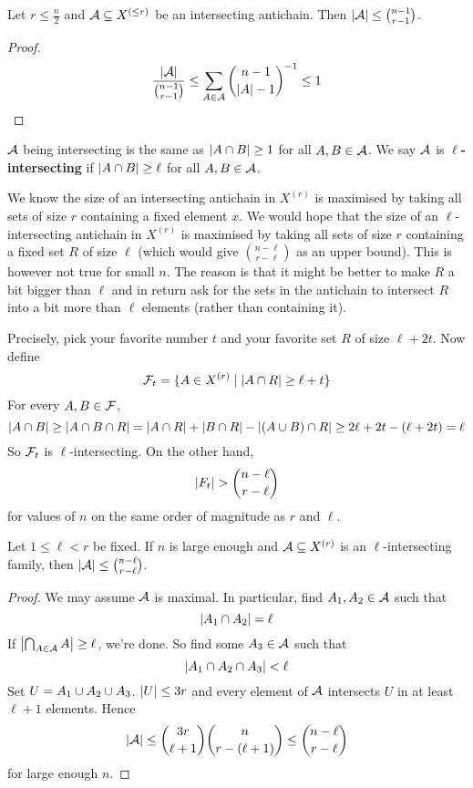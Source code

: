 \documentclass{article}
\begin{document}
\begin{nthm}
  Let $r \le \frac n2$ and $\mathcal A \subseteq X^{(\le r)}$ be an intersecting antichain. Then $\left\lvert \mathcal A\right\rvert \le \binom{n - 1}{r - 1}$.
\end{nthm}
\begin{proof}
  $$\frac{\left\lvert \mathcal A\right\rvert}{\binom{n - 1}{r - 1}} \le \sum_{A \in \mathcal A} \binom{n - 1}{\left\lvert A\right\rvert - 1}^{-1} \le 1$$
\end{proof}

$\mathcal A$ being intersecting is the same as $\left\lvert A \cap B\right\rvert \ge 1$ for all $A, B \in \mathcal A$. We say $\mathcal A$ is {\bf $\ell$-intersecting} if $\left\lvert A \cap B\right\rvert \ge \ell$ for all $A, B \in \mathcal A$.

We know the size of an intersecting antichain in $X^{(r)}$ is maximised by taking all sets of size $r$ containing a fixed element $x$. We would hope that the size of an $\ell$-intersecting antichain in $X^{(r)}$ is maximised by taking all sets of size $r$ containing a fixed set $R$ of size $\ell$ (which would give $\binom{n - \ell}{r - \ell}$ as an upper bound). This is however not true for small $n$. The reason is that it might be better to make $R$ a bit bigger than $\ell$ and in return ask for the sets in the antichain to intersect $R$ into a bit more than $\ell$ elements (rather than containing it).

Precisely, pick your favorite number $t$ and your favorite set $R$ of size $\ell + 2t$. Now define
$$\mathcal F_t = \{A \in X^{(r)} \mid \left\lvert A \cap R\right\rvert \ge \ell + t\}$$
For every $A, B \in \mathcal F$,
$$\left\lvert A \cap B\right\rvert \ge \left\lvert A \cap B \cap R\right\rvert = \left\lvert A \cap R\right\rvert + \left\lvert B \cap R\right\rvert - \left\lvert (A \cup B) \cap R\right\rvert \ge 2\ell + 2t - (\ell + 2t) = \ell$$
So $\mathcal F_t$ is $\ell$-intersecting. On the other hand,
$$\left\lvert F_t\right\rvert > \binom{n - \ell}{r - \ell}$$
for values of $n$ on the same order of magnitude as $r$ and $\ell$.

\begin{nthm}
  Let $1 \le \ell < r$ be fixed. If $n$ is large enough and $\mathcal A \subseteq X^{(r)}$ is an $\ell$-intersecting family, then $\left\lvert \mathcal A\right\rvert \le \binom{n - \ell}{r - \ell}$.
\end{nthm}
\begin{proof}
  We may assume $\mathcal A$ is maximal. In particular, find $A_1, A_2 \in \mathcal A$ such that
  $$\left\lvert A_1 \cap A_2\right\rvert = \ell$$
  If $\left\lvert \bigcap_{A \in \mathcal A} A\right\rvert \ge \ell$, we're done. So find some $A_3 \in \mathcal A$ such that
  $$\left\lvert A_1 \cap A_2 \cap A_3\right\rvert < \ell$$
  Set $U = A_1 \cup A_2 \cup A_3$. $\left\lvert U\right\rvert \le 3r$ and every element of $\mathcal A$ intersects $U$ in at least $\ell + 1$ elements. Hence
  $$\left\lvert \mathcal A\right\rvert \le \binom{3r}{\ell + 1}\binom n{r - (\ell + 1)} \le \binom{n - \ell}{r - \ell}$$
  for large enough $n$.
\end{proof}
\end{document}
